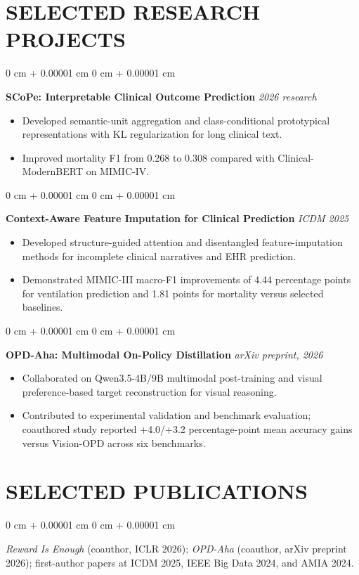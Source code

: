 \documentclass[10pt, letterpaper]{article}
\newenvironment{highlights}{
    \begin{itemize}[
        topsep=0.03 cm,
        parsep=0.02 cm,
        partopsep=0pt,
        itemsep=0pt,
        leftmargin=0 cm + 10pt
    ]
}{
    \end{itemize}
} %
\newenvironment{onecolentry}{
    \begin{adjustwidth}{
        0 cm + 0.00001 cm
    }{
        0 cm + 0.00001 cm
    }
}{
    \end{adjustwidth}
} %
\begin{document}
\section{SELECTED RESEARCH PROJECTS}
\begin{onecolentry}
\textbf{SCoPe: Interpretable Clinical Outcome Prediction} \hfill \textit{2026 research}
\begin{highlights}
\item Developed semantic-unit aggregation and class-conditional prototypical representations with KL regularization for long clinical text.
\item Improved mortality F1 from 0.268 to 0.308 compared with Clinical-ModernBERT on MIMIC-IV.
\end{highlights}
\end{onecolentry}
\vspace{0.02 cm}
\begin{onecolentry}
\textbf{Context-Aware Feature Imputation for Clinical Prediction} \hfill \textit{ICDM 2025}
\begin{highlights}
\item Developed structure-guided attention and disentangled feature-imputation methods for incomplete clinical narratives and EHR prediction.
\item Demonstrated MIMIC-III macro-F1 improvements of 4.44 percentage points for ventilation prediction and 1.81 points for mortality versus selected baselines.
\end{highlights}
\end{onecolentry}
\vspace{0.02 cm}
\begin{onecolentry}
\textbf{OPD-Aha: Multimodal On-Policy Distillation} \hfill \textit{arXiv preprint, 2026}
\begin{highlights}
\item Collaborated on Qwen3.5-4B/9B multimodal post-training and visual preference-based target reconstruction for visual reasoning.
\item Contributed to experimental validation and benchmark evaluation; coauthored study reported +4.0/+3.2 percentage-point mean accuracy gains versus Vision-OPD across six benchmarks.
\end{highlights}
\end{onecolentry}
\vspace{0.02 cm}
\section{SELECTED PUBLICATIONS}
\begin{onecolentry}
\textit{Reward Is Enough} (coauthor, ICLR 2026); \textit{OPD-Aha} (coauthor, arXiv preprint 2026); first-author papers at ICDM 2025, IEEE Big Data 2024, and AMIA 2024.
\end{onecolentry}
\end{document}
